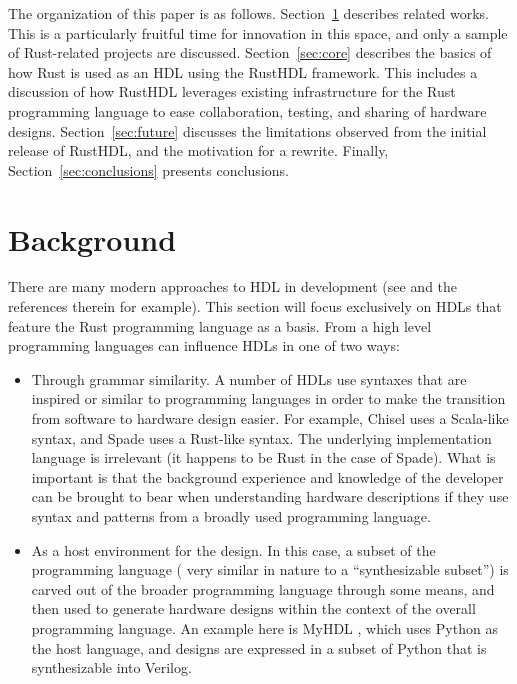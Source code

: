 \documentclass[conference]{IEEEtran}
\begin{document}
The organization of this paper is as follows.  Section~\ref{sec:related} describes related
works.  This is a particularly fruitful time for innovation in this space, and only a
sample of Rust-related projects are discussed. Section~\ref{sec:core} describes the 
basics of how Rust is used as an HDL using the RustHDL
framework.  This includes a discussion of how RustHDL leverages existing infrastructure 
for the Rust programming language to ease collaboration, testing, and sharing of hardware 
designs.  Section~\ref{sec:future} discusses the limitations observed from the initial
release of RustHDL, and the motivation for a rewrite.  Finally, Section~\ref{sec:conclusions}
presents conclusions.

\section{Background}\label{sec:related}

There are many modern approaches to HDL in development (see \cite{b1} and the references therein for example).  
This section will focus exclusively on HDLs that feature the Rust programming language as a basis.
From a high level programming languages can influence HDLs in one of two ways:

\begin{itemize}
  \item Through grammar similarity.  A number of HDLs use syntaxes that are inspired or similar to
  programming languages in order to make the transition from software to hardware design easier.
  For example, Chisel \cite{b2} uses a Scala-like syntax, and Spade \cite{b1} uses a Rust-like syntax.
  The underlying implementation language is irrelevant (it happens to be Rust in the case of Spade).
  What is important is that the background experience and knowledge of the developer can be brought 
  to bear when understanding hardware descriptions if they use syntax and patterns from a broadly
  used programming language.
  \item As a host environment for the design.  In this case, a subset of the programming language (
    very similar in nature to a ``synthesizable subset'') is carved out of the broader programming language
    through some means, and then used to generate hardware designs within the context of the overall
    programming language.  An example here is MyHDL \cite{b3}, which uses Python as the host language, and 
    designs are expressed in a subset of Python that is synthesizable into Verilog.
\end{itemize}
\end{document}
